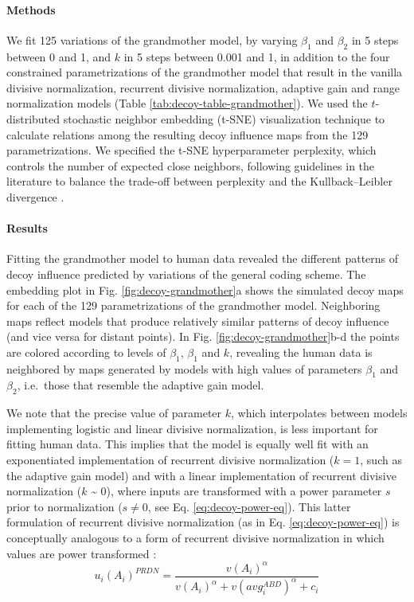 \documentclass[a4paper, nobind]{templates/ociamthesis}
\begin{document}
\hypertarget{methods-2}{%
\paragraph{Methods}\label{methods-2}}

We fit 125 variations of the grandmother model, by varying \(\beta_1\) and \(\beta_2\) in 5 steps between 0 and 1, and \(k\) in 5 steps between 0.001 and 1, in addition to the four constrained parametrizations of the grandmother model that result in the vanilla divisive normalization, recurrent divisive normalization, adaptive gain and range normalization models (Table \ref{tab:decoy-table-grandmother}). We used the \(t\)-distributed stochastic neighbor embedding (t-SNE) visualization technique \autocite{vandermaaten2008} to calculate relations among the resulting decoy influence maps from the 129 parametrizations. We specified the t-SNE hyperparameter perplexity, which controls the number of expected close neighbors, following guidelines in the literature to balance the trade-off between perplexity and the Kullback--Leibler divergence \autocite{cao2017}.

\hypertarget{results-2}{%
\paragraph{Results}\label{results-2}}

Fitting the grandmother model to human data revealed the different patterns of decoy influence predicted by variations of the general coding scheme. The embedding plot in Fig. \ref{fig:decoy-grandmother}a shows the simulated decoy maps for each of the 129 parametrizations of the grandmother model. Neighboring maps reflect models that produce relatively similar patterns of decoy influence (and vice versa for distant points). In Fig. \ref{fig:decoy-grandmother}b-d the points are colored according to levels of \(\beta_1\), \(\beta_1\) and \(k\), revealing the human data is neighbored by maps generated by models with high values of parameters \(\beta_1\) and \(\beta_2\), i.e.~those that resemble the adaptive gain model.

We note that the precise value of parameter \(k\), which interpolates between models implementing logistic and linear divisive normalization, is less important for fitting human data. This implies that the model is equally well fit with an exponentiated implementation of recurrent divisive normalization (\(k = 1\), such as the adaptive gain model) and with a linear implementation of recurrent divisive normalization (\(k\) \textasciitilde{} \(0\)), where inputs are transformed with a power parameter \(s\) prior to normalization (\(s\neq 0\), see Eq. \eqref{eq:decoy-power-eq}). This latter formulation of recurrent divisive normalization (as in Eq. \eqref{eq:decoy-power-eq}) is conceptually analogous to a form of recurrent divisive normalization in which values are power transformed \autocite[as in][]{daviet2018}:
\begin{equation}
u_i(A_i)^{PRDN} = \frac{v(A_i)^{\alpha}}{v(A_i)^{\alpha}+v(avg_i^{ABD})^{\alpha}+c_i}
\label{eq:decoy-prdn}
\end{equation}
\end{document}

